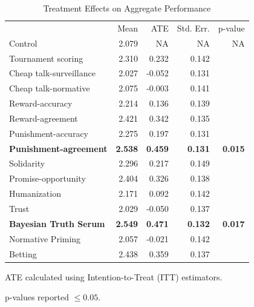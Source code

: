 \documentclass{chi2009}
\begin{document}
{%
\begin{table}[ht]					%
\begin{center}						%
\caption{Treatment Effects on Aggregate Performance} %
\vspace{8pt}
\begin{threeparttable}
\begin{tabular}{@{}l r r r r@{}}
\toprule
& Mean & ATE\tnote{\dag} & Std. Err. & p-value\tnote{\ddag}\\
\cmidrule(l){2-5}
Control & 2.079 & NA & NA & NA\\
Tournament scoring & 2.310 & 0.232 & 0.142 &\\
Cheap talk-surveillance& 2.027 & -0.052 & 0.131 &\\
Cheap talk-normative& 2.075 & -0.003 & 0.141 &\\
Reward-accuracy& 2.214 & 0.136 & 0.139 &\\
Reward-agreement& 2.421 & 0.342 & 0.135 &\\
Punishment-accuracy& 2.275 & 0.197 & 0.131 & \\
\textbf{Punishment-agreement} & \textbf{2.538} & \textbf{0.459} & \textbf{0.131} & \textbf{0.015}\\
Solidarity& 2.296 & 0.217 & 0.149 &\\
Promise-opportunity& 2.404 & 0.326 & 0.138 &\\
Humanization& 2.171 & 0.092 & 0.142 &\\
Trust& 2.029 & -0.050 & 0.137 &\\
\textbf{Bayesian Truth Serum} & \textbf{2.549} & \textbf{0.471} & \textbf{0.132} & \textbf{0.017}\\
Normative Priming& 2.057 & -0.021 & 0.142 &\\
Betting& 2.438 & 0.359 & 0.137 &\\ 
  \bottomrule
\end{tabular}
  \begin{tablenotes}[para]
     \item[\dag]ATE calculated using Intention-to-Treat (ITT) estimators.\\
     \item[\ddag]p-values reported $\leq 0.05$.
  \end{tablenotes}
\end{threeparttable}
\label{table:agg_results_ITT}
\end{center}
\end{table}

}
\end{document}

